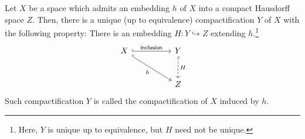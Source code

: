 \begin{lem}\label{emb&cptf}
    Let $X$ be a space which admits an embedding $h$ of $X$ into a compact Hausdorff space $Z$.
    Then, there is a unique (up to equivalence) compactification $Y$ of $X$ with the following property:
    There is an embedding $H: Y\hookrightarrow Z$ extending $h$.\footnote{Here, $Y$ is unique up to equivalence, but $H$ need not be unique.}
    \begin{equation*}
        \begin{tikzcd}[row sep=large, column sep=huge]
            X \arrow[dr, "h"', hook] \arrow[r, "\textsf{inclusion}", hook] & Y \arrow[d, "H", hook, dashed] \\
            &Z
        \end{tikzcd}
    \end{equation*}
    Such compactification $Y$ is called the compactification of $X$ induced by $h$.
\end{lem}
